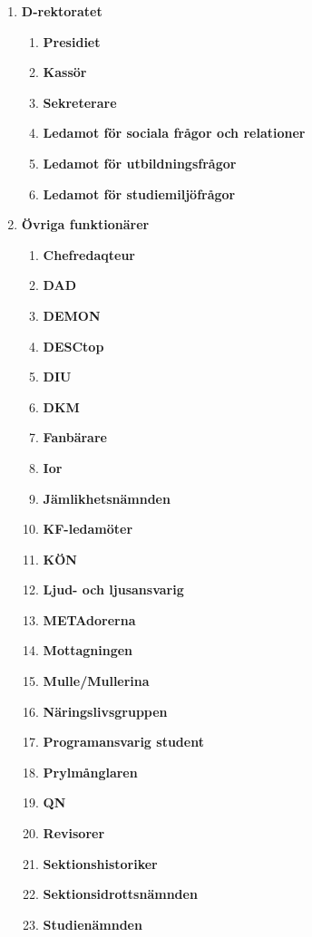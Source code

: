 \documentclass{protokoll}
\begin{document}
  \begin{enumerate}
    \item \textbf{D-rektoratet}
      \begin{enumerate}
        \item \textbf{Presidiet}
        \item \textbf{Kassör}
        \item \textbf{Sekreterare}
        \item \textbf{Ledamot för sociala frågor och relationer}
        \item \textbf{Ledamot för utbildningsfrågor}
        \item \textbf{Ledamot för studiemiljöfrågor}
      \end{enumerate}
    \item \textbf{Övriga funktionärer}
      \begin{enumerate}
      	\item \textbf{Chefredaqteur}
      	\item \textbf{DAD}
        \item \textbf{DEMON}
        \item \textbf{DESCtop}
        \item \textbf{DIU}
        \item \textbf{DKM}
        \item \textbf{Fanbärare}
        \item \textbf{Ior}
        \item \textbf{Jämlikhetsnämnden}
        \item \textbf{KF-ledamöter}
        \item \textbf{KÖN}
  		\item \textbf{Ljud- och ljusansvarig}
        \item \textbf{METAdorerna}
        \item \textbf{Mottagningen}
  		\item \textbf{Mulle/Mullerina}
        \item \textbf{Näringslivsgruppen}
        \item \textbf{Programansvarig student}
        \item \textbf{Prylmånglaren}
        \item \textbf{QN}
        \item \textbf{Revisorer}
        \item \textbf{Sektionshistoriker}
        \item \textbf{Sektionsidrottsnämnden}
        \item \textbf{Studienämnden}

\end{enumerate}
\end{enumerate}
\end{document}
